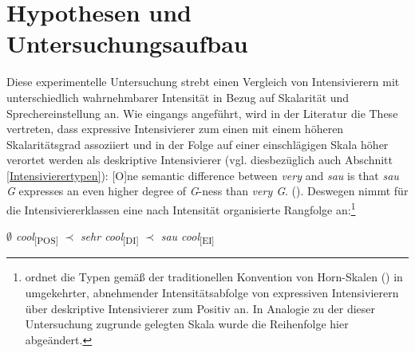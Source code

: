 



\section{Hypothesen und Untersuchungsaufbau}\label{abs:Hypothese und Forschungsaufbau}
Diese experimentelle Untersuchung strebt einen Vergleich von Intensivierern mit unterschiedlich wahrnehmbarer Intensität in Bezug auf Skalarität und Sprechereinstellung an. Wie eingangs angeführt, wird in der Literatur die These vertreten, dass expressive Intensivierer zum einen mit einem höheren Skalaritätsgrad assoziiert und in der Folge auf einer einschlägigen Skala höher verortet werden als deskriptive Intensivierer (vgl. diesbezüglich auch {Abschnitt \ref{Intensivierertypen}}): \glqq{}[O]ne semantic difference between \textit{very} and \textit{sau} is that \textit{sau G} expresses an even higher degree of \textit{G}-ness than {\textit{very G}}.\grqq{} ({\citealt[133]{Gutzmann.2019a}}). Deswegen nimmt {\citet[133]{Gutzmann.2019a}} für die Intensiviererklassen eine nach Intensität organisierte Rangfolge an:\footnote{\citet[133]{Gutzmann.2019a} ordnet die Typen gemäß der traditionellen Konvention von Horn-Skalen (\citealt[]{Horn.1972}) in umgekehrter, abnehmender Intensitätsabfolge von expressiven Intensivierern über deskriptive Intensivierer zum Positiv an. In Analogie zu der dieser Untersuchung zugrunde gelegten Skala wurde die Reihenfolge hier abgeändert.} \smallskip


\textit{$\emptyset$ cool}\textsubscript{[POS]} $\prec$ \textit{sehr cool}\textsubscript{[DI]} $\prec$ \textit{sau cool}\textsubscript{[EI]} \smallskip

